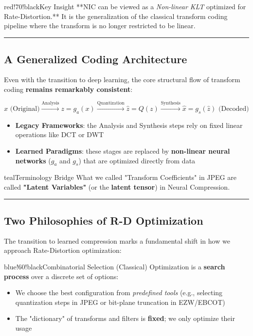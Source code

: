 \begin{calloutbox}{red!70!black}{Key Insight}
**NIC can be viewed as a \textit{Non-linear KLT} optimized for Rate-Distortion.** It is the generalization of the classical transform coding pipeline where the transform is no longer restricted to be linear.
\end{calloutbox}

\bigskip\hrule\bigskip

\subsection{A Generalized Coding Architecture}

Even with the transition to deep learning, the core structural flow of transform coding \textbf{remains remarkably consistent}:

\[
x \text{ (Original)} \xrightarrow{\text{Analysis}} z = g_a(x) \xrightarrow{\text{Quantization}} \hat{z} = Q(z) \xrightarrow{\text{Synthesis}} \hat{x} = g_s(\hat{z}) \text{ (Decoded)}
\]

\begin{itemize}
\item \textbf{Legacy Frameworks}: the Analysis and Synthesis steps rely on fixed linear operations like DCT or DWT
\item \textbf{Learned Paradigms}: these stages are replaced by \textbf{non-linear neural networks} ($g_a$ and $g_s$) that are optimized directly from data
\end{itemize}

\begin{calloutbox}{teal}{Terminology Bridge}
What we called "Transform Coefficients" in JPEG are called \textbf{"Latent Variables"} (or the \textbf{latent tensor}) in Neural Compression.
\end{calloutbox}

\bigskip\hrule\bigskip

\subsection{Two Philosophies of R-D Optimization}

The transition to learned compression marks a fundamental shift in how we approach Rate-Distortion optimization:

\begin{calloutbox}{blue!60!black}{Combinatorial Selection (Classical)}
Optimization is a \textbf{search process} over a discrete set of options:
\begin{itemize}
\item We choose the best configuration from \textit{predefined tools} (e.g., selecting quantization steps in JPEG or bit-plane truncation in EZW/EBCOT)
\item The "dictionary" of transforms and filters is \textbf{fixed}; we only optimize their usage
\end{itemize}
\end{calloutbox}

